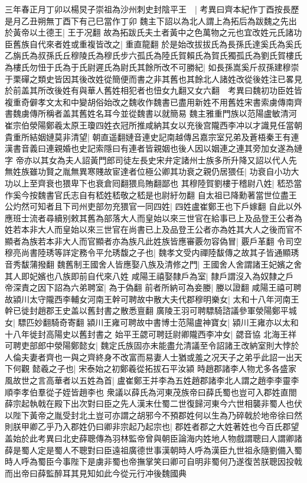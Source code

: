 三年春正月丁卯以楊炅子崇祖為沙州刺史封陰平王　|{
	考異曰齊本紀作丁酉按長歷是月乙丑朔無丁酉下有己巳當作丁卯}
魏主下詔以為北人謂上為拓后為跋魏之先出於黃帝以土德王|{
	王于况翻}
故為拓跋氏夫土者黃中之色萬物之元也宜改姓元氏諸功臣舊族自代來者姓或重複皆改之|{
	重直龍翻}
於是始改拔拔氏為長孫氏達奚氏為奚氏乙旃氏為叔孫氏丘穆陵氏為穆氏步六孤氏為陸氏賀賴氏為賀氏獨孤氏為劉氏賀樓氏為樓氏勿忸于氏為于氏尉遲氏為尉氏其餘所改不可勝紀|{
	如長孫嵩奚斤叔孫建穆崇于栗磾之類史皆因其後改姓從簡便而書之非其舊也其餘北人諸姓改從後姓注已畧見於前盖其所改後姓有與華人舊姓相犯者也忸女九翻又女六翻　考異曰魏初功臣姓皆複重奇僻孝文太和中變胡俗始改之魏收作魏書已盡用新姓不用舊姓宋書索虜傳南齊書魏虜傳所稱者盖其舊姓名耳今並從魏書以就簡易}
魏主雅重門族以范陽盧敏清河崔宗伯滎陽鄭羲太原王瓊四姓衣冠所推咸納其女以充後宫隴西李冲以才識見任當朝貴重所結姻㜕莫非清望|{
	朝直遥翻㜕音連史記南越傳呂嘉宗室兄弟及蒼梧秦王有連漢書音義曰連親婚也史記索隱曰有連者皆親姻也後人因以姻連之連其旁加女遂為㜕字}
帝亦以其女為夫人詔黃門郎司徒左長史宋弁定諸州士族多所升降又詔以代人先無姓族雖功賢之胤無異寒賤故宦達者位極公卿其功衰之親仍居猥任|{
	功衰自小功大功以上至齊衰也猥卑下也衰倉囘翻猥烏賄翻鄙也}
其穆陸賀劉樓于稽尉八姓|{
	嵇恐當作奚今按魏書官氏志自有嵇姓嵇敬之嵇是也尉紆勿翻}
自太祖已降勳著當世位盡王公灼然可知者且下司州吏部勿充猥官一同四姓|{
	四姓盧崔鄭王也下戶嫁翻}
自此以外應班士流者尋續别敕其舊為部落大人而皇始以來三世官在給事已上及品登王公者為姓若本非大人而皇始以來三世官在尚書已上及品登王公者亦為姓其大人之後而官不顯者為族若本非大人而官顯者亦為族凡此姓族皆應審覈勿容偽冒|{
	覈戶革翻}
令司空穆亮尚書陸琇等詳定務令平允琇馥之子也|{
	魏孝文受内禪陸馛傳之故其子皆通顯琇音秀馛蒲撥翻}
魏舊制王國舍人皆應娶八族及清修之門|{
	王國舍人舍謂諸王妃嬪之舍其人即妃嬪也八族即前自代來八姓}
咸陽王禧娶隸戶為室|{
	隸戶謂沒入為奴隸之戶}
帝深責之因下詔為六弟聘室|{
	為于偽翻}
前者所納可為妾媵|{
	媵以證翻}
咸陽王禧可聘故潁川太守隴西李輔女河南王幹可聘故中散大夫代郡穆明樂女|{
	太和十八年河南王幹已徙封趙郡王史盖以舊封書之散悉亶翻}
廣陵王羽可聘驃騎諮議參軍滎陽鄭平城女|{
	驃匹妙翻騎奇寄翻}
潁川王雍可聘故中書博士范陽盧神寶女|{
	潁川王雍亦以太和十八年徙封高陽史以舊封書之}
始平王勰可聘廷尉卿隴西李冲女|{
	勰音協}
北海王祥可聘吏部郎中滎陽鄭懿女|{
	魏定氏族固亦未能盡允清議至令詔諸王改納室則大悖於人倫夫妻者齊也一與之齊終身不改富而易妻人士猶或羞之况天子之弟乎此詔一出天下何觀}
懿羲之子也|{
	宋泰始之初鄭羲從拓拔石平汝潁}
時趙郡諸李人物尤多各盛家風故世之言高華者以五姓為首|{
	盧崔鄭王并李為五姓趙郡諸李北人謂之趙李李靈李順李孝伯羣從子姪皆趙李也}
衆議以薛氏為河東茂族帝曰薛氏蜀也豈可入郡姓直閤薛宗起執戟在殿下出次對曰臣之先人漢末仕蜀二世復歸河東今六世相襲非蜀人也伏以陛下黃帝之胤受封北土豈可亦謂之胡邪今不預郡姓何以生為乃碎戟於地帝徐曰然則朕甲卿乙乎乃入郡姓仍曰卿非宗起乃起宗也|{
	郡姓者郡之大姓著姓也今百氏郡望盖始於此考異曰北史薛聰傳為羽林監帝曾與朝臣論海内姓地人物戲謂聰曰人謂卿諸薛是蜀人定是蜀人不聰對曰臣遠祖廣德世事漢朝時人呼為漢臣九世祖永隨劉備入蜀時人呼為蜀臣今事陛下是虜非蜀也帝撫掌笑曰卿可自明非蜀何乃遂復苦朕聰因投戟而出帝曰薛監醉耳其見知如此今從元行冲後魏國典}
